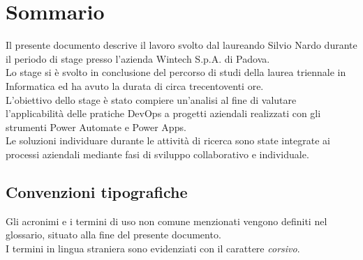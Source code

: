 \cleardoublepage
{}
{}
\begingroup
\let\clearpage\relax
\let\cleardoublepage\relax
\let\cleardoublepage\relax

\chapter*{Sommario}

Il presente documento descrive il lavoro svolto dal laureando Silvio Nardo durante il periodo di stage presso l'azienda Wintech S.p.A. di Padova.\\
Lo stage si è svolto in conclusione del percorso di studi della laurea triennale in Informatica ed ha avuto la durata di circa trecentoventi ore.\\
L'obiettivo dello stage è stato compiere un'analisi al fine di valutare l'applicabilità delle pratiche DevOps a progetti aziendali realizzati con gli strumenti Power Automate e Power Apps.\\
Le soluzioni individuare durante le attività di ricerca sono state integrate ai processi aziendali mediante fasi di sviluppo collaborativo e individuale. 

\section*{Convenzioni tipografiche}
Gli acronimi e i termini di uso non comune menzionati vengono definiti nel glossario, situato alla fine del presente documento.\\
I termini in lingua straniera sono evidenziati con il carattere \emph{corsivo}.





\endgroup

\vfill
